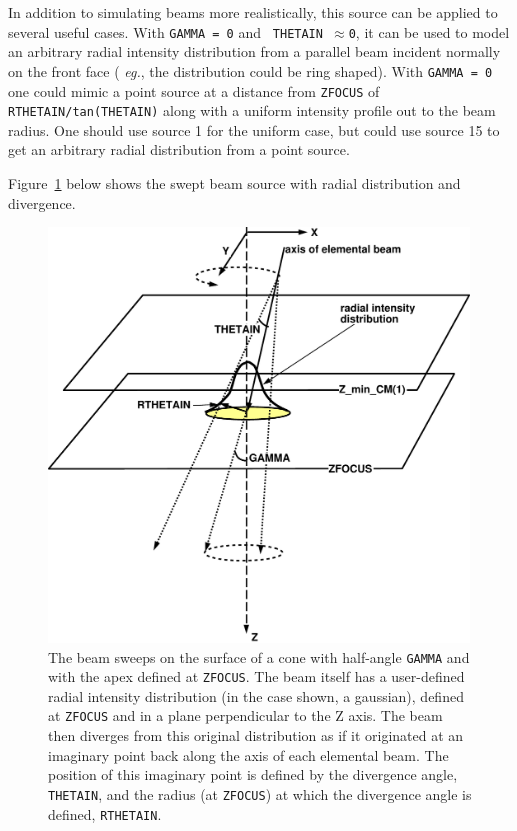 \documentclass[12pt,twoside]{article}
\newcommand{\eg}{{\em eg.}}
\begin{document}
In addition to simulating beams more realistically, this source can be
applied to several useful cases. With {\tt GAMMA = 0} and {\tt
THETAIN~$\approx$0}, it can be used to model an arbitrary radial intensity
distribution from a parallel beam incident normally on the front face (
\eg, the distribution could be ring shaped).  With {\tt GAMMA = 0} one
could mimic a point source at a distance from {\tt ZFOCUS} of {\tt
RTHETAIN/tan(THETAIN)} along with a uniform intensity profile out to the
beam radius. One should use source 1 for the uniform case, but could use
source 15 to get an arbitrary radial distribution from a point source.

Figure~\ref{fig_src15} below shows the swept beam source with radial
distribution and divergence.
\begin{figure}[htbp]
\vspace*{-0.35cm}
\begin{center}
\leavevmode
\mbox{}\hspace{0cm}
\includegraphics[height=11cm]{figures/src15}
\caption[ISOURC=15: NRC swept beam with radial intensity distribution and
divergence]
{The beam sweeps on the surface of a cone with half-angle {\tt GAMMA} and
with the apex defined at {\tt ZFOCUS}.  The beam itself has a user-defined radial
intensity distribution (in the case shown, a gaussian), defined at {\tt ZFOCUS}
and in a plane perpendicular to the Z axis.  The beam then diverges from this
original distribution as if it originated at an imaginary point back along
the axis of each elemental beam.  The position of this imaginary point is defined by the
divergence angle, {\tt THETAIN}, and the radius (at {\tt ZFOCUS}) at which
the divergence angle is defined, {\tt RTHETAIN}.}
\label{fig_src15}
\end{center}
\end{figure}
\end{document}

